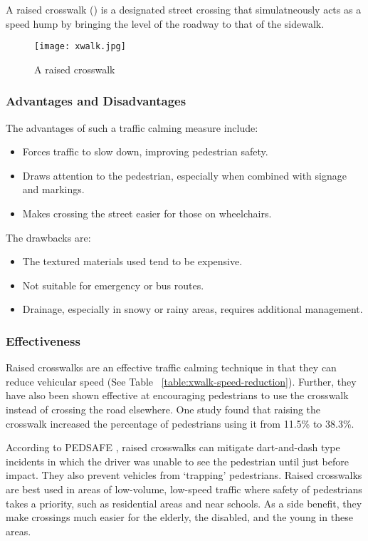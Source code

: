 A raised crosswalk () is a designated street crossing that simulatneously acts as a speed hump by bringing the level of the roadway to that of the sidewalk.

\begin{figure}[h]
	\centering
	\texttt{[image: xwalk.jpg]}
	\caption[A raised crosswalk]{A raised crosswalk\cite{kimley-xwalk}}\label{fig:xwalk}
\end{figure}

\subsubsection{Advantages and Disadvantages}

The advantages of such a traffic calming measure include:\begin{itemize}
	\item Forces traffic to slow down, improving pedestrian safety.
	\item Draws attention to the pedestrian, especially when combined with signage and markings.
	\item Makes crossing the street easier for those on wheelchairs.
\end{itemize}

The drawbacks are:\begin{itemize}
	\item The textured materials used tend to be expensive.
	\item Not suitable for emergency or bus routes.
	\item Drainage, especially in snowy or rainy areas, requires additional management.
\end{itemize}

\subsubsection{Effectiveness}

Raised crosswalks are an effective traffic calming technique in that they can reduce vehicular speed (See Table ~\ref{table:xwalk-speed-reduction}). Further, they have also been shown effective at encouraging pedestrians to use the crosswalk instead of crossing the road elsewhere. One study \cite{pedsafe-xwalks} found that raising the crosswalk increased the percentage of pedestrians using it from 11.5\% to 38.3\%. 



According to PEDSAFE \cite{pedsafe-xwalks}, raised crosswalks can mitigate dart-and-dash type incidents in which the driver was unable to see the pedestrian until just before impact. They also prevent vehicles from `trapping' pedestrians. Raised crosswalks are best used in areas of low-volume, low-speed traffic where safety of pedestrians takes a priority, such as residential areas and near schools. As a side benefit, they make crossings much easier for the elderly, the disabled, and the young in these areas.

